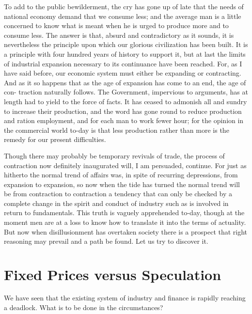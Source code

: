 \documentclass{book}
\begin{document}
To add to the public bewilderment, the cry has gone up of late that the needs of national economy demand that we consume less; and the average man is a little concerned to know what is meant when he is urged to produce more and to consume less. The answer is that, absurd and contradictory as it sounds, it is nevertheless the principle upon which our glorious civilization has been built. It is a principle with four hundred years of history to support it, but at last the limits of industrial expansion necessary to its continuance have been reached. For, as I have said before, our economic system must either be expanding or contracting. And as it so happens that as the age of expansion has come to an end, the age of con- traction naturally follows. The Government, impervious to arguments, has at length had to yield to the force of facts. It has ceased to admonish all and sundry to increase their production, and the word has gone round to reduce production and ration employment, and for each man to work fewer hour; for the opinion in the commercial world to-day is that less production rather than more is the remedy for our present difficulties.

Though there may probably be temporary revivals of trade, the process of contraction now definitely inaugurated will, I am persuaded, continue. For just as hitherto the normal trend of affairs was, in spite of recurring depressions, from expansion to expansion, so now when the tide has turned the normal trend will be from contraction to contraction a tendency that can only be checked by a complete change in the spirit and conduct of industry such as is involved in return to fundamentals. This truth is vaguely apprehended to-day, though at the moment men are at a loss to know how to translate it into the terms of actuality. But now when disillusionment has overtaken society there is a prospect that right reasoning may prevail and a path be found. Let us try to discover it.

\chapter{Fixed Prices versus Speculation}
\label{chapter-6}
We have seen that the existing system of industry and finance is rapidly reaching a deadlock. What is to be done in the circumstances?
\end{document}
